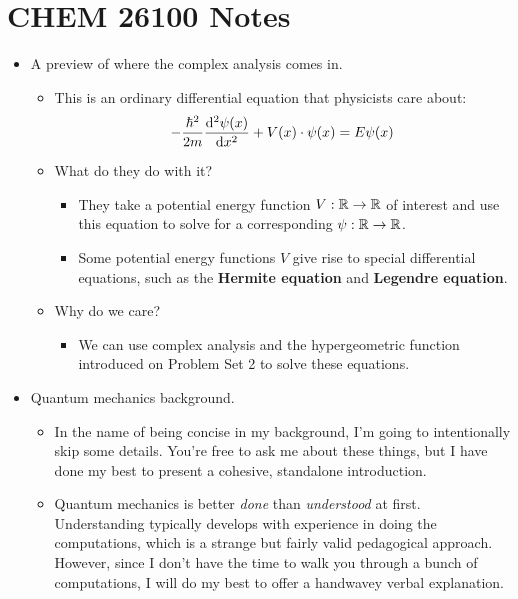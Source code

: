 \documentclass[../finalProject.tex]{subfiles}
\begin{document}
\section*{CHEM 26100 Notes}
\begin{itemize}
    \item {}A preview of where the complex analysis comes in.
    \begin{itemize}
        \item This is an ordinary differential equation that physicists care about:
        \begin{equation*}
            -\frac{\hbar^2}{2m}\dv[2]{\psi(x)}{x}+V(x)\cdot\psi(x) = E\psi(x)
        \end{equation*}
        \item What do they do with it?
        \begin{itemize}
            \item They take a potential energy function $V:\mathbb{R}\to\mathbb{R}$ of interest and use this equation to solve for a corresponding $\psi:\mathbb{R}\to\mathbb{R}$.
            \item Some potential energy functions $V$ give rise to special differential equations, such as the \textbf{Hermite equation} and \textbf{Legendre equation}.
        \end{itemize}
        \item Why do we care?
        \begin{itemize}
            \item We can use complex analysis and the hypergeometric function introduced on Problem Set 2 to solve these equations.
        \end{itemize}
    \end{itemize}
    \item Quantum mechanics background.
    \begin{itemize}
        \item In the name of being concise in my background, I'm going to intentionally skip some details. You're free to ask me about these things, but I have done my best to present a cohesive, standalone introduction.
        \item Quantum mechanics is better \emph{done} than \emph{understood} at first. Understanding typically develops with experience in doing the computations, which is a strange but fairly valid pedagogical approach. However, since I don't have the time to walk you through a bunch of computations, I will do my best to offer a handwavey verbal explanation.

\end{itemize}
\end{itemize}
\end{document}

